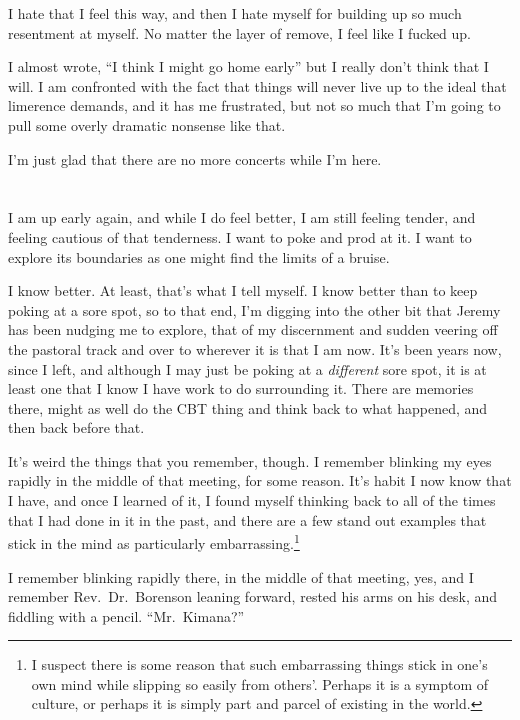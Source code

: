 I hate that I feel this way, and then I hate myself for building up so much resentment at myself. No matter the layer of remove, I feel like I fucked up.

I almost wrote, ``I think I might go home early'' but I really don't think that I will. I am confronted with the fact that things will never live up to the ideal that limerence demands, and it has me frustrated, but not so much that I'm going to pull some overly dramatic nonsense like that.

I'm just glad that there are no more concerts while I'm here.

\section{}

I am up early again, and while I do feel better, I am still feeling tender, and feeling cautious of that tenderness. I want to poke and prod at it. I want to explore its boundaries as one might find the limits of a bruise.

I know better. At least, that's what I tell myself. I know better than to keep poking at a sore spot, so to that end, I'm digging into the other bit that Jeremy has been nudging me to explore, that of my discernment and sudden veering off the pastoral track and over to wherever it is that I am now. It's been years now, since I left, and although I may just be poking at a \emph{different} sore spot, it is at least one that I know I have work to do surrounding it. There are memories there, might as well do the CBT thing and think back to what happened, and then back before that.

It's weird the things that you remember, though. I remember blinking my eyes rapidly in the middle of that meeting, for some reason. It's habit I now know that I have, and once I learned of it, I found myself thinking back to all of the times that I had done in it in the past, and there are a few stand out examples that stick in the mind as particularly embarrassing.\footnote{I suspect there is some reason that such embarrassing things stick in one's own mind while slipping so easily from others'. Perhaps it is a symptom of culture, or perhaps it is simply part and parcel of existing in the world.}

I remember blinking rapidly there, in the middle of that meeting, yes, and I remember Rev.~Dr.~Borenson leaning forward, rested his arms on his desk, and fiddling with a pencil. ``Mr.~Kimana?''


